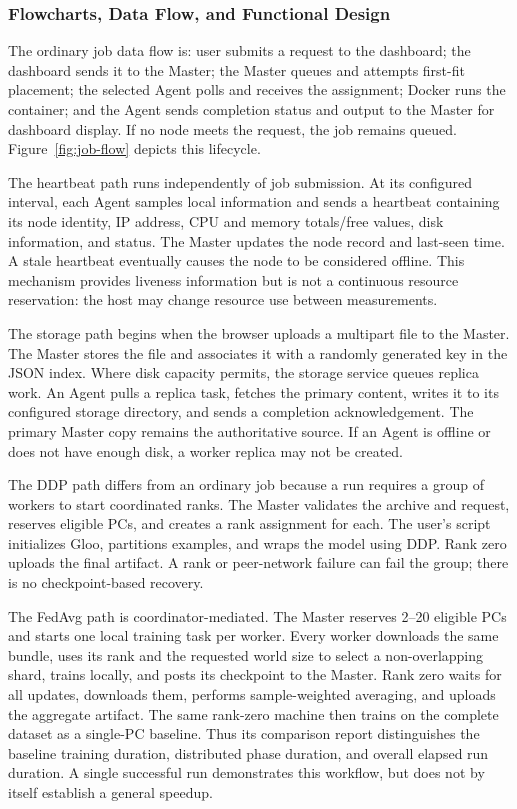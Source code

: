 \documentclass{article}
\begin{document}
	\subsubsection{Flowcharts, Data Flow, and Functional Design}
The ordinary job data flow is: user submits a request to the dashboard; the dashboard sends it to the Master; the Master queues and attempts first-fit placement; the selected Agent polls and receives the assignment; Docker runs the container; and the Agent sends completion status and output to the Master for dashboard display. If no node meets the request, the job remains queued. Figure~\ref{fig:job-flow} depicts this lifecycle.

The heartbeat path runs independently of job submission. At its configured interval, each Agent samples local information and sends a heartbeat containing its node identity, IP address, CPU and memory totals/free values, disk information, and status. The Master updates the node record and last-seen time. A stale heartbeat eventually causes the node to be considered offline. This mechanism provides liveness information but is not a continuous resource reservation: the host may change resource use between measurements.

The storage path begins when the browser uploads a multipart file to the Master. The Master stores the file and associates it with a randomly generated key in the JSON index. Where disk capacity permits, the storage service queues replica work. An Agent pulls a replica task, fetches the primary content, writes it to its configured storage directory, and sends a completion acknowledgement. The primary Master copy remains the authoritative source. If an Agent is offline or does not have enough disk, a worker replica may not be created.

The DDP path differs from an ordinary job because a run requires a group of workers to start coordinated ranks. The Master validates the archive and request, reserves eligible PCs, and creates a rank assignment for each. The user's script initializes Gloo, partitions examples, and wraps the model using DDP. Rank zero uploads the final artifact. A rank or peer-network failure can fail the group; there is no checkpoint-based recovery.

The FedAvg path is coordinator-mediated. The Master reserves 2--20 eligible PCs and starts one local training task per worker. Every worker downloads the same bundle, uses its rank and the requested world size to select a non-overlapping shard, trains locally, and posts its checkpoint to the Master. Rank zero waits for all updates, downloads them, performs sample-weighted averaging, and uploads the aggregate artifact. The same rank-zero machine then trains on the complete dataset as a single-PC baseline. Thus its comparison report distinguishes the baseline training duration, distributed phase duration, and overall elapsed run duration. A single successful run demonstrates this workflow, but does not by itself establish a general speedup.
\end{document}
